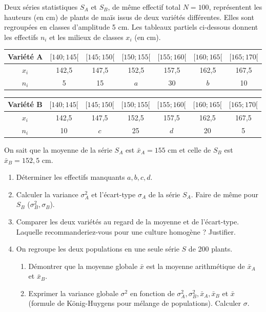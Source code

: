 \documentclass[11pt]{article}
\begin{document}
\begin{exercice}
Deux séries statistiques $S_A$ et $S_B$, de même effectif total $N=100$, représentent les hauteurs (en cm) de plants de maïs issus de deux variétés différentes. Elles sont regroupées en classes d'amplitude 5 cm. Les tableaux partiels ci-dessous donnent les effectifs $n_i$ et les milieux de classes $x_i$ (en cm).

\begin{center}
\begin{tabular}{|c|c|c|c|c|c|c|}
\hline
\textbf{Variété A} & $[140;145[$ & $[145;150[$ & $[150;155[$ & $[155;160[$ & $[160;165[$ & $[165;170[$ \\
\hline $x_i$ & 142,5 & 147,5 & 152,5 & 157,5 & 162,5 & 167,5 \\
\hline $n_i$ & 5 & 15 & $a$ & 30 & $b$ & 10 \\
\hline
\end{tabular}
\quad
\begin{tabular}{|c|c|c|c|c|c|c|}
\hline
\textbf{Variété B} & $[140;145[$ & $[145;150[$ & $[150;155[$ & $[155;160[$ & $[160;165[$ & $[165;170[$ \\
\hline $x_i$ & 142,5 & 147,5 & 152,5 & 157,5 & 162,5 & 167,5 \\
\hline $n_i$ & 10 & $c$ & 25 & $d$ & 20 & 5 \\
\hline
\end{tabular}
\end{center}
On sait que la moyenne de la série $S_A$ est $\bar{x}_A = 155$ cm et celle de $S_B$ est $\bar{x}_B = 152,5$ cm.
\begin{enumerate}
    \item Déterminer les effectifs manquants $a, b, c, d$.
    \item Calculer la variance $\sigma_A^2$ et l'écart-type $\sigma_A$ de la série $S_A$. Faire de même pour $S_B$ ($\sigma_B^2, \sigma_B$).
    \item Comparer les deux variétés au regard de la moyenne et de l'écart-type. Laquelle recommanderiez-vous pour une culture homogène ? Justifier.
    \item On regroupe les deux populations en une seule série $S$ de 200 plants. 
    \begin{enumerate}
        \item Démontrer que la moyenne globale $\bar{x}$ est la moyenne arithmétique de $\bar{x}_A$ et $\bar{x}_B$.
        \item Exprimer la variance globale $\sigma^2$ en fonction de $\sigma_A^2, \sigma_B^2, \bar{x}_A, \bar{x}_B$ et $\bar{x}$ (formule de König-Huygens pour mélange de populations). Calculer $\sigma$.
    \end{enumerate}
\end{enumerate}
\end{exercice}
\end{document}
